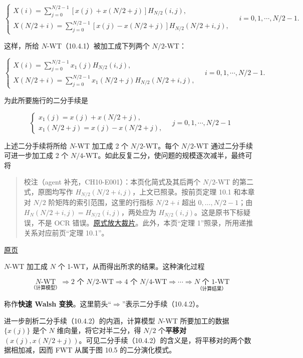 \documentclass[
  10pt,
  fontset=fandol]{ctexart}
\begin{document}
\[
\begin{cases}
\displaystyle X(i)=\sum_{j=0}^{N/2-1}[x(j)+x(N/2+j)]H_{N/2}(i,j),\\[6pt]
\displaystyle X(N/2+i)=\sum_{j=0}^{N/2-1}[x(j)-x(N/2+j)]H_{N/2}(N/2+i,j),
\end{cases}\quad i=0,1,\cdots,N/2-1.
\]

这样，所给 \(N\)-WT（10.4.1）被加工成下列两个 \(N/2\)-WT：

\[
\begin{cases}
\displaystyle X(i)=\sum_{j=0}^{N/2-1}x_1(j)H_{N/2}(i,j),\\[6pt]
\displaystyle X(N/2+i)=\sum_{j=0}^{N/2-1}x_1(N/2+j)H_{N/2}(N/2+i,j),
\end{cases}\quad i=0,1,\cdots,N/2-1.
\]

为此所要施行的二分手续是

\[
\begin{cases}
x_1(j)=x(j)+x(N/2+j),\\
x_1(N/2+j)=x(j)-x(N/2+j),
\end{cases}\quad j=0,1,\cdots,N/2-1
\tag{10.4.2}
\]

上述二分手续将所给 \(N\)-WT 加工成 2 个 \(N/2\)-WT。每个 \(N/2\)-WT 通过二分手续可进一步加工成 2 个 \(N/4\)-WT。如此反复二分，使问题的规模逐次减半，最终可将

\begin{quote}
校注（agent 补充，CH10-E001）：本页化简式及其后两个 \(N/2\)-WT 的第二式，原图均写作 \(H_{N/2}(N/2+i,j)\)，上文已照录。按前页定理 10.1 和本章对 \(N/2\) 阶矩阵的索引范围，这里的行指标 \(N/2+i\) 超出 \(0,\ldots,N/2-1\)；由 \(H_N(N/2+i,j)=H_{N/2}(i,j)\)，两处应为 \(H_{N/2}(i,j)\)。这是原书下标疑误，不是 OCR 错误。\href{../assets/ch10/erratum-p271-indices.png}{原式放大裁片}。此外，本页``定理 1''照录，所用递推关系对应前页``定理 10.1''。
\end{quote}

\href{../../source-images/pdf-272.jpeg}{原页}

\(N\)-WT 加工成 \(N\) 个 1-WT，从而得出所求的结果。这种演化过程

\[
\underset{\text{（计算模型）}}{N\text{-WT}}\Rightarrow2\text{ 个 }N/2\text{-WT}\Rightarrow4\text{ 个 }N/4\text{-WT}\Rightarrow\cdots\Rightarrow\underset{\text{（计算结果）}}{N\text{ 个 }1\text{-WT}}
\]

称作\textbf{快速 Walsh 变换}。这里箭头``\(\Rightarrow\)''表示二分手续（10.4.2）。

进一步剖析二分手续（10.4.2）的内涵，计算模型 \(N\)-WT 所要加工的数据 \(\{x(j)\}\) 是个 \(N\) 维向量，将它对半二分，得 \(N/2\) 个\textbf{平移对} \((x(j),x(N/2+j))\)。可见二分手续（10.4.2）的含义是，将平移对的两个数据相加减，因而 FWT 从属于图 10.5 的二分演化模式。
\end{document}
